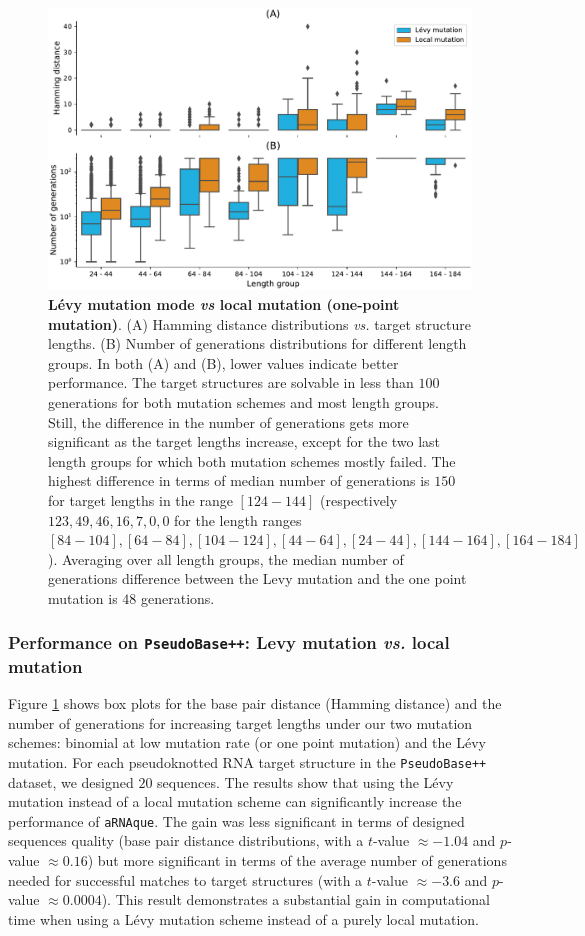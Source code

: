 \begin{figure}[H]
	\includegraphics[width=1.0 \linewidth]{../res/images/arnaque/fig4.pdf}
	\small \caption{\textbf{Lévy mutation mode \emph{vs} local mutation (one-point mutation)}. (A) Hamming distance distributions \emph{vs.} target structure lengths. (B)  Number of generations distributions for different length groups. In both (A) and (B), lower values indicate better performance. The target structures are solvable in less than $100$ generations for both mutation schemes and most length groups. Still, the difference in the number of generations gets more significant as the target lengths increase, except for the two last length groups for which both mutation schemes mostly failed. The highest difference in terms of median number of generations is $150$ for target lengths in the range $[124-144]$ (respectively $123, 49, 46, 16, 7, 0, 0$ for the length ranges $[84-104], [64-84], [104-124], [44-64], [24-44], [144-164], [164-184]$). Averaging over all length groups, the median number of generations difference between the Levy mutation and the one point mutation is $48$ generations. }\label{Fig:OP_vs_aRNAque}
\end{figure}
\subsubsection{Performance on \texttt{PseudoBase++}: Levy mutation \emph{vs.} local mutation}
Figure \ref{Fig:OP_vs_aRNAque} shows box plots for the base pair distance (Hamming distance) and the number of generations for increasing target lengths under our two mutation schemes: binomial at low mutation rate (or one point mutation) and the Lévy mutation. For each pseudoknotted RNA target structure in the \texttt{PseudoBase++} dataset, we designed $20$ sequences.  The results show that using the Lévy mutation instead of a local mutation scheme can significantly increase the performance of \texttt{aRNAque}.  The gain was less significant in terms of designed sequences quality  (base pair distance distributions, with a $t$-value $\approx -1.04$ and $p$-value $\approx 0.16$) but more significant in terms of the average number of generations needed for successful matches to target structures (with a $t$-value $\approx -3.6$ and $p$-value $\approx 0.0004$). This result demonstrates a substantial gain in computational time when using a Lévy mutation scheme instead of a purely local mutation.

